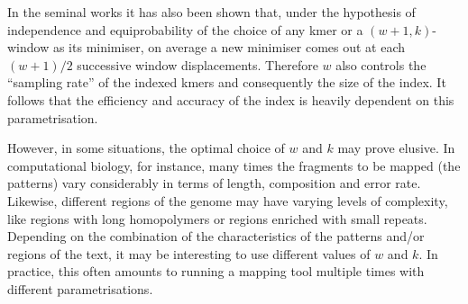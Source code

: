 \documentclass[a4paper, 12pt, oneside]{article}
\begin{document}
In the seminal works \cite{Schleimer2003, Roberts2004} it has also been shown that, under the hypothesis of independence and equiprobability of the choice of any kmer or a $(w+1,k)$-window as its minimiser, on average a new minimiser comes out at each $(w+1)/2$ successive window displacements. Therefore $w$ also controls the ``sampling rate'' of the indexed kmers and consequently the size of the index. It follows that the efficiency and accuracy of the index is heavily dependent on this parametrisation.

However, in some situations, the optimal choice of $w$ and $k$ may prove elusive. In computational biology, for instance, many times the fragments to be mapped (the patterns) vary considerably in terms of length, composition and error rate. Likewise, different regions of the genome may have varying levels of complexity, like regions with long homopolymers or regions enriched with small repeats. Depending on the combination of the characteristics of the patterns and/or regions of the text, it may be interesting to use different values of $w$ and $k$. In practice, this often amounts to running a mapping tool multiple times with different parametrisations.
\end{document}
